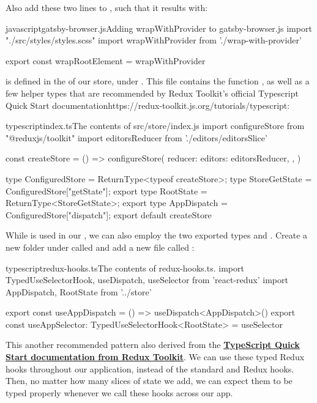 \documentclass[paper=6in:9in,pagesize=pdftex,headinclude=on,footinclude=on,12pt,twoside]{scrbook}
\newcommand{\link}[2]{\textbf{\textcolor{monokaiPink}{\href{#2}{#1}}}}
\begin{document}
Also add these two lines to , such that it results with:

\begin{codeInput}{javascript}{gatsby-browser.js}{Adding wrapWithProvider to gatsby-browser.js}
import "./src/styles/styles.scss"
import wrapWithProvider from './wrap-with-provider'

export const wrapRootElement = wrapWithProvider
\end{codeInput}

 is defined in the  of our store, under . This file contains the function , as well as a few helper types that are recommended by {Redux Toolkit's official Typescript Quick Start documentation}{https://redux-toolkit.js.org/tutorials/typescript}:

\begin{codeInput}{typescript}{index.ts}{The contents of src/store/index.js}
import { configureStore } from "@reduxjs/toolkit"
import editorsReducer from './editors/editorsSlice'

const createStore = () => configureStore({
  reducer: {
    editors: editorsReducer,
  },
})

type ConfiguredStore = ReturnType<typeof createStore>;
type StoreGetState = ConfiguredStore["getState"];
export type RootState = ReturnType<StoreGetState>;
export type AppDispatch = ConfiguredStore["dispatch"];
export default createStore
\end{codeInput}

While  is used in our , we can also employ the two exported types  and . Create a new folder under  called  and add a new file called :

\begin{codeInput}{typescript}{redux-hooks.ts}{The contents of redux-hooks.ts.}
import { TypedUseSelectorHook, useDispatch, useSelector } from 'react-redux'
import { AppDispatch, RootState } from '../store'

export const useAppDispatch = () => useDispatch<AppDispatch>()
export const useAppSelector: TypedUseSelectorHook<RootState> = useSelector
\end{codeInput}

This another recommended pattern also derived from the \link{TypeScript Quick Start documentation from Redux Toolkit}{https://redux-toolkit.js.org/tutorials/typescript}. We can use these typed Redux hooks throughout our application, instead of the standard  and  Redux hooks. Then, no matter how many slices of state we add, we can expect them to be typed properly whenever we call these hooks across our app.
\end{document}
